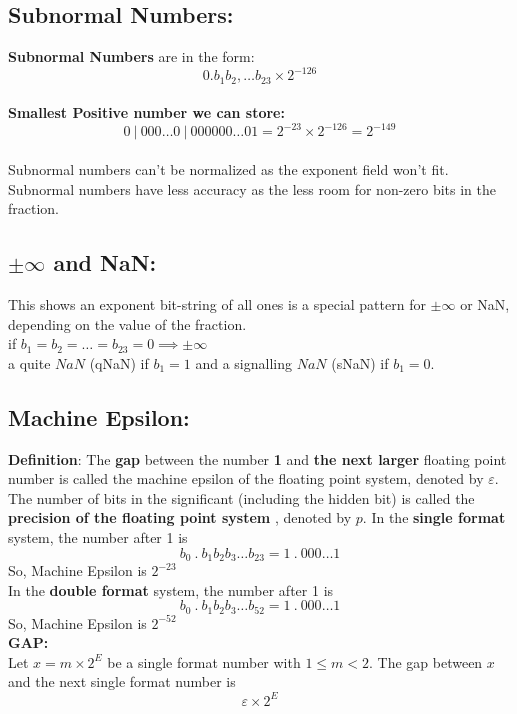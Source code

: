 \documentclass [9 pt]{article}
\theoremstyle{definition}
\begin{document}
\newpage
\subsection*{Subnormal Numbers:}
\textbf{Subnormal Numbers} are in the form:
$$ 0.b_1b_2, \ldots b_{23} \times 2^{-126} $$\\
\textbf{Smallest Positive number we can store:}
$$ 0 \ |\ 000 \ldots 0 \ |\  000000 \ldots 01  = 2^{-23} \times 2^{-126} =  2^{-149}$$\\
Subnormal numbers can't be normalized as the exponent field won't fit.\\
Subnormal numbers have less accuracy as the less room for non-zero bits in the fraction.



\subsection*{$\pm \infty$ and NaN:}
This shows an exponent bit-string of all ones is a special pattern for $\pm \infty$ or NaN, depending on the value of the fraction.\\
if $ b_1  = b_2 = \ldots = b_{23} = 0 \implies \pm \infty $\\
\newline
a quite $NaN$ (qNaN) if $b_1 = 1$ and a signalling $NaN$
 (sNaN) if $ b_1 = 0 $.


\subsection*{Machine Epsilon:}
\textbf{Definition}: The \textbf{gap} between the number \textbf{1} and \textbf{the next larger} floating point number is called the machine epsilon of the floating point system, denoted by $\varepsilon$.\\
\newline
The number of bits in the significant (including the hidden bit) is called the \textbf{ precision of the floating point system }, denoted by $p$.
\newline
\newline
In the \textbf{single format} system, the number after 1 is
$$   b_0\ . \ b_1 b_2 b_3 \ldots b_{23} = 1\ .\ 000 \ldots 1 $$
So, Machine Epsilon is $2^{-23}$\\
\newline\newline
In the \textbf{double format} system, the number after 1 is
$$   b_0\ . \ b_1 b_2 b_3 \ldots b_{52} = 1\ .\ 000 \ldots 1 $$
So, Machine Epsilon is $2^{-52}$\\
\newline
\textbf{GAP:}\\
Let $x=m\times 2^E$ be a single format number with $1 \leq m < 2$. The gap between $x$ and the next single format number is
$$ \varepsilon \times 2^E $$
\end{document}
